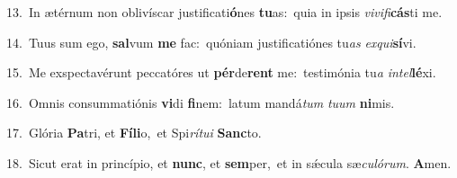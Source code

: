 {\numbfont\textcolor{\numbcolor}{13.}}~In ætérnum non oblivíscar justificati\-\textbf{ó}\-nes \textbf{tu}\-as:~\star quia in ipsis \textit{vi}\-\textit{vi}\textit{fi}\textbf{cás}ti me.\par
{\numbfont\textcolor{\numbcolor}{14.}}~Tuus sum ego, \textbf{sal}\-vum \textbf{me} fac:~\star quóniam justificatiónes tu\textit{as} \textit{ex}\-\textit{qui}\textbf{sí}vi.\par
{\numbfont\textcolor{\numbcolor}{15.}}~Me exspectavérunt peccatóres ut \textbf{pér}\-de\textbf{rent} me:~\star testimónia tu\textit{a} \textit{in}\-\textit{tel}\textbf{lé}xi.\par
{\numbfont\textcolor{\numbcolor}{16.}}~Omnis consummatiónis \textbf{vi}\-di \textbf{fi}\-nem:~\star latum mandá\textit{tum} \textit{tu}\-\textit{um} \textbf{ni}\-mis.\par
{\numbfont\textcolor{\numbcolor}{17.}}~Glória \textbf{Pa}\-tri, et \textbf{Fí}\-\textbf{li}o,~\star et Spi\-\textit{rí}\-\textit{tu}\textit{i} \textbf{Sanc}\-to.\par
{\numbfont\textcolor{\numbcolor}{18.}}~Sicut erat in princípio, et \textbf{nunc}\-, et \textbf{sem}\-per,~\star et in sǽcula sæ\-\textit{cu}\-\textit{ló}\textit{rum}. \textbf{A}\-men.\par
